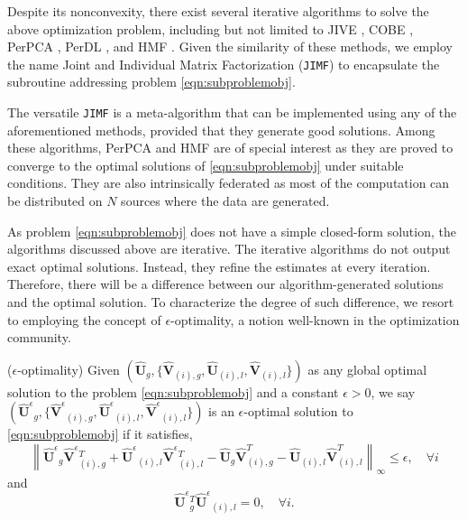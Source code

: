 \documentclass[twoside,11pt]{article}
\def\inneralg{\texttt{JIMF}\xspace}
\newcommand{\norm}[1]{\left\lVert#1\right\rVert}
\newcommand{\hmatU}{\hat{\mathbf{U}}}
\newcommand{\hmatV}{\hat{\mathbf{V}}}
\newcommand{\hmatUeps}{\hat{\mathbf{U}}^{\epsilon}{}}
\newcommand{\hmatVeps}{\hat{\mathbf{V}}^{\epsilon}{}}
\begin{document}
Despite its nonconvexity, there exist several iterative algorithms to solve the above optimization problem, including but not limited to JIVE \citep{jive}, COBE \citep{cobe}, PerPCA \citep{personalizedpca}, PerDL \citep{perdl}, and HMF \citep{hmf}. Given the similarity of these methods, we employ the name Joint and Individual Matrix Factorization (\inneralg) to encapsulate the subroutine addressing problem \eqref{eqn:subproblemobj}.


The versatile \inneralg is a meta-algorithm that can be implemented using any of the aforementioned methods, provided that they generate good solutions. Among these algorithms, PerPCA and HMF are of special interest as they are proved to converge to the optimal solutions of \eqref{eqn:subproblemobj} under suitable conditions. They are also intrinsically federated as most of the computation can be distributed on $N$ sources where the data are generated. %

As problem \eqref{eqn:subproblemobj} does not have a simple closed-form solution, the algorithms discussed above are iterative. The iterative algorithms do not output exact optimal solutions. Instead, they refine the estimates at every iteration. Therefore, there will be a difference between our algorithm-generated solutions and the optimal solution. To characterize the degree of such difference, we resort to employing the concept of $\epsilon$-optimality, a notion well-known in the optimization community.

\begin{definition} 
($\epsilon$-optimality) Given $(\hmatU_g,\{\hmatV_{(i),g}, \hmatU_{(i),l},\hmatV_{(i),l}\})$ as any global optimal solution to the problem \eqref{eqn:subproblemobj} and a constant $\epsilon>0$, we say $(\hmatUeps_g,\{\hmatVeps_{(i),g}, \hmatUeps_{(i),l},\hmatVeps_{(i),l}\})$ is an $\epsilon$-optimal solution to \eqref{eqn:subproblemobj} if it satisfies,
\begin{equation*}
\norm{\hmatUeps_g\hmatVeps_{(i),g}^T+\hmatUeps_{(i),l}\hmatVeps_{(i),l}^T-\hmatU_g\hmatV_{(i),g}^T-\hmatU_{(i),l}\hmatV_{(i),l}^T}_{\infty}\le \epsilon,\quad \forall i
\end{equation*}
and 
\begin{equation*}
\hmatUeps_g^T\hmatUeps_{(i),l} = 0,\quad \forall i .
\end{equation*}
\end{definition}
\end{document}
